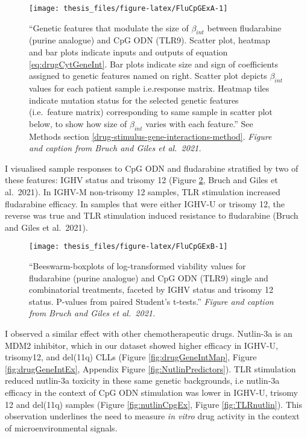 \documentclass[11pt, a4paper, twosided]{book}
\begin{document}
\begin{figure}

{\centering \texttt{[image: thesis\_files/figure-latex/FluCpGExA-1]} 

}

\caption{``Genetic features that modulate the size of \(\beta_{int}\) between fludarabine (purine analogue) and CpG ODN (TLR9). Scatter plot, heatmap and bar plots indicate inputs and outputs of equation \eqref{eq:drugCytGeneInt}. Bar plots indicate size and sign of coefficients assigned to genetic features named on right. Scatter plot depicts \(\beta_{int}\) values for each patient sample i.e.response matrix. Heatmap tiles indicate mutation status for the selected genetic features (i.e.~feature matrix) corresponding to same sample in scatter plot below, to show how size of \(\beta_{int}\) varies with each feature.'' See Methods section \ref{drug-stimulus-gene-interactions-method}. \emph{Figure and caption from Bruch and Giles et al.~2021.}}\label{fig:FluCpGExA}
\end{figure}
I visualised sample responses to CpG ODN and fludarabine stratified by two of these features: IGHV status and trisomy 12 (Figure \ref{fig:FluCpGExB}, Bruch and Giles et al.~2021). In IGHV-M non-trisomy 12 samples, TLR stimulation increased fludarabine efficacy. In samples that were either IGHV-U or trisomy 12, the reverse was true and TLR stimulation induced resistance to fludarabine (Bruch and Giles et al.~2021).


\begin{figure}

{\centering \texttt{[image: thesis\_files/figure-latex/FluCpGExB-1]} 

}

\caption{``Beeswarm-boxplots of log-transformed viability values for fludarabine (purine analogue) and CpG ODN (TLR9) single and combinatorial treatments, faceted by IGHV status and trisomy 12 status. P-values from paired Student's t-tests.'' \emph{Figure and caption from Bruch and Giles et al.~2021.}}\label{fig:FluCpGExB}
\end{figure}
I observed a similar effect with other chemotherapeutic drugs. Nutlin-3a is an MDM2 inhibitor, which in our dataset showed higher efficacy in IGHV-U, trisomy12, and del(11q) CLLs (Figure \ref{fig:drugGeneIntMap}, Figure \ref{fig:drugGeneIntEx}, Appendix Figure \ref{fig:NutlinPredictors}). TLR stimulation reduced nutlin-3a toxicity in these same genetic backgrounds, i.e nutlin-3a efficacy in the context of CpG ODN stimulation was lower in IGHV-U, trisomy 12 and del(11q) samples (Figure \ref{fig:nutlinCpgEx}, Figure \ref{fig:TLRnutlin}). This observation underlines the need to measure \emph{in vitro} drug activity in the context of microenvironmental signals.
\end{document}
